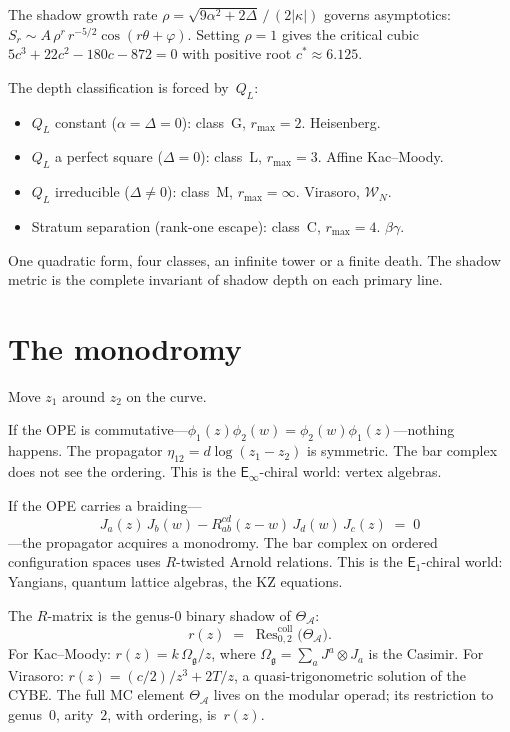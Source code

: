 \documentclass[11pt]{article}
\newcommand{\cA}{\mathcal{A}}
\newcommand{\cW}{\mathcal{W}}
\newcommand{\fg}{\mathfrak{g}}
\newcommand{\Eone}{\mathsf{E}_1}
\newcommand{\Einf}{\mathsf{E}_{\infty}}
\newcommand{\Res}{\operatorname{Res}}
\begin{document}
The shadow growth rate
$\rho = \sqrt{9\alpha^2 + 2\Delta}\,/\,(2|\kappa|)$
governs asymptotics:
$S_r \sim A\,\rho^r\, r^{-5/2}\cos(r\theta + \varphi)$.
Setting $\rho = 1$ gives the critical cubic
$5c^3 + 22c^2 - 180c - 872 = 0$ with positive root
$c^* \approx 6.125$.

The depth classification is forced by~$Q_L$:
\begin{itemize}[nosep]
\item $Q_L$ constant ($\alpha = \Delta = 0$):
  class~G, $r_{\max} = 2$.  Heisenberg.
\item $Q_L$ a perfect square ($\Delta = 0$):
  class~L, $r_{\max} = 3$.  Affine Kac--Moody.
\item $Q_L$ irreducible ($\Delta \neq 0$):
  class~M, $r_{\max} = \infty$.  Virasoro, $\cW_N$.
\item Stratum separation (rank-one escape):
  class~C, $r_{\max} = 4$.  $\beta\gamma$.
\end{itemize}
One quadratic form, four classes, an infinite tower or a
finite death.  The shadow metric is the complete invariant
of shadow depth on each primary line.


\section{The monodromy}
\label{sec:monodromy}

Move $z_1$ around $z_2$ on the curve.

If the OPE is commutative---$\phi_1(z)\phi_2(w) =
\phi_2(w)\phi_1(z)$---nothing happens.  The propagator
$\eta_{12} = d\log(z_1 - z_2)$ is symmetric.  The bar complex
does not see the ordering.  This is the $\Einf$-chiral world:
vertex algebras.

If the OPE carries a braiding---
\[
J_a(z)\, J_b(w) - R^{cd}_{ab}(z{-}w)\, J_d(w)\, J_c(z)
\;=\; 0
\]
---the propagator acquires a monodromy.  The bar complex on
ordered configuration spaces uses $R$-twisted Arnold relations.
This is the $\Eone$-chiral world: Yangians, quantum lattice
algebras, the KZ equations.

The $R$-matrix is the genus-$0$ binary shadow of $\Theta_\cA$:
\begin{equation}\label{eq:rmatrix-shadow-wn}
r(z) \;=\;
\Res^{\mathrm{coll}}_{0,2}\bigl(\Theta_\cA\bigr).
\end{equation}
For Kac--Moody:
$r(z) = k\,\Omega_\fg/z$, where
$\Omega_\fg = \sum_a J^a \otimes J_a$ is the Casimir.
For Virasoro:
$r(z) = (c/2)/z^3 + 2T/z$, a quasi-trigonometric solution
of the CYBE.  The full MC element $\Theta_\cA$
lives on the modular operad; its restriction to genus~$0$,
arity~$2$, with ordering, is~$r(z)$.
\end{document}
